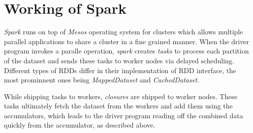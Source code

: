 \documentclass[12pt, a4paper]{article}
\begin{document}
\section*{Working of Spark}
\textit{Spark}\cite{Zaharia:2010:SCC:1863103.1863113} runs on top of \textit{Mesos} operating system for clusters which allows multiple parallel applications to share a cluster in a fine grained manner. When the driver program invokes a paralle operation, \textit{spark}\cite{Zaharia:2010:SCC:1863103.1863113} creates \textit{tasks} to process each partition of the dataset and sends these tasks to worker nodes via delayed scheduling. Different types of RDDs differ in their implementation of RDD interface, the most prominnent ones being \textit{MappedDataset} and \textit{CachedDataset}.\par

While shipping tasks to workers, \textit{closures} are shipped to worker nodes. These tasks ultimately fetch the dataset from the workers and add them using the accumulators, which leads to the driver program reading off the combined data quickly from the accumulator, as described above.\par



\end{document}
